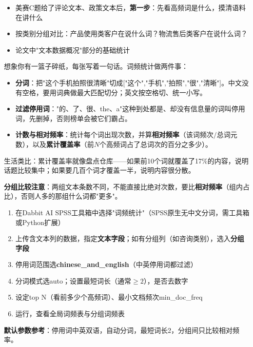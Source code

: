 \begin{algoscene}
\begin{itemize}
    \item 美赛C题给了评论文本、政策文本后，\textbf{第一步}：先看高频词是什么，摸清语料在讲什么
    \item 按类别分组对比：产品使用类客户在说什么词？物流售后类客户在说什么词？
    \item 论文中"文本数据概况"部分的基础统计
\end{itemize}
\end{algoscene}

\begin{algoprinciple}
想象你有一篮子碎纸，每张写着一句话。词频统计做两件事：

\begin{itemize}
    \item \textbf{分词}：把"这个手机拍照很清晰"切成["这个","手机","拍照","很","清晰"]。中文没有空格，要用词典做最大匹配切分；英文按空格切、统一小写。
    \item \textbf{过滤停用词}："的、了、很、the、a"这种到处都是、却没有信息量的词叫停用词，先删掉，否则榜单会被它们霸占。
    \item \textbf{计数与相对频率}：统计每个词出现次数，并算\textbf{相对频率}（该词频次$/$总词元数），以及\textbf{累计覆盖率}（前$N$个高频词占了总词次的百分之多少）。
\end{itemize}

生活类比：累计覆盖率就像盘点仓库——如果前10个词就覆盖了17\%的内容，说明话题比较集中；如果要几百个词才覆盖一半，说明内容很分散。

\textbf{分组比较注意}：两组文本条数不同，不能直接比绝对次数，要比\textbf{相对频率}（组内占比），否则人多的那组什么词都"更多"。
\end{algoprinciple}

\begin{algosposs}
\begin{enumerate}
    \item 在Dabbit AI SPSS工具箱中选择"词频统计"（SPSS原生无中文分词，需工具箱或Python扩展）
    \item 上传含文本列的数据，指定\textbf{文本字段}；如有分组列（如咨询类别），选入\textbf{分组字段}
    \item 停用词范围选\textbf{chinese\_and\_english}（中英停用词都过滤）
    \item 分词模式选auto；设置最短词长（通常$\geq2$），是否去数字
    \item 设定top N（看前多少个高频词）、最小文档频次min\_doc\_freq
    \item 运行，查看全局词频表与分组词频表
\end{enumerate}

\textbf{默认参数参考}：停用词中英双语，自动分词，最短词长2，分组间只比较相对频率。
\end{algosposs}


